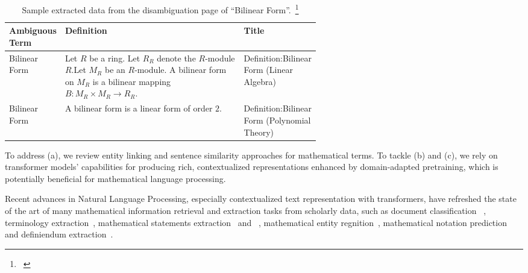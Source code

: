 
\begin{table}
    \centering
    \begin{tabular}{|l|p{0.6\linewidth}|l|}
          \hline
          Ambiguous Term&Definition&Title\\\hline
Bilinear Form&Let $R$ be a ring. Let $R_R$ denote the $R$-module $R$.Let $M_R$ be an $R$-module. A bilinear form on $M_R$ is a bilinear mapping $B : M_R \times M_R \to R_R$.&Definition:Bilinear Form (Linear Algebra) \\\hline
Bilinear Form& A bilinear form is a linear form of order $2$.&Definition:Bilinear Form (Polynomial Theory)\\\hline
    \end{tabular}
    \caption{Sample extracted data from the disambiguation page of ``Bilinear Form''.~\footnote{~} }
    \label{tab:}
\end{table}


 To address (a), we review entity linking and sentence similarity approaches for mathematical terms. To tackle (b) and (c), we rely on transformer models' capabilities for producing rich, contextualized representations enhanced by domain-adapted pretraining, which is potentially beneficial for mathematical language processing.


Recent advances in Natural Language Processing, especially contextualized text representation with transformers, have refreshed the state of the art of many mathematical information retrieval and extraction tasks from scholarly data, such as document classification ~,  terminology extraction~, mathematical statements extraction~ and ~, mathematical entity regnition~, 
mathematical notation prediction~\cite{jo2021notation} %
and definiendum extraction~\cite{jiang2023extracting}.



